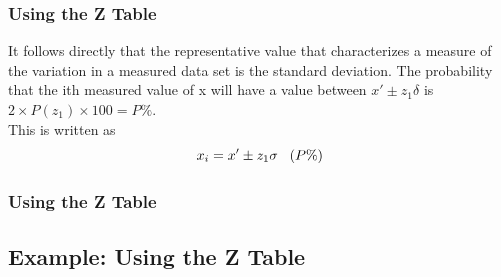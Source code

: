 \documentclass[fleqn]{beamer} %
\newcommand{\sectionIIsubsectionIIItitle}{Using the Z Table}
\newcommand{\sectionIIsubsectionIVtitle}{Example: Using the Z Table}
\begin{document}
			\begin{frame}
				\frametitle{\sectionIIsubsectionIIItitle}
						It follows directly that the representative value that characterizes a measure of the variation in a
				measured data set is the standard deviation. The probability that the ith measured value of x will
				have a value between $x' \pm z_1 \delta$ is $2 \times P(z_1) \times 100 = P\%$. \\

					This is written as \\
					
						\[ x_i = x' \pm z_1\sigma \hspace{3mm} (P\%) \]        
						
			

			\end{frame}

			\begin{frame}
			\frametitle{\sectionIIsubsectionIIItitle}





			\end{frame}

		\subsection{\sectionIIsubsectionIVtitle}\label{sectionIIsubsectionIV}
\end{document}
